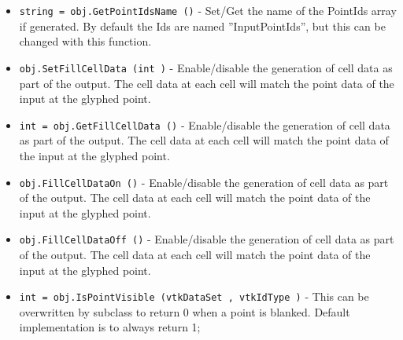 \begin{itemize}
\item  \verb|string = obj.GetPointIdsName ()| -  Set/Get the name of the PointIds array if generated. By default the Ids
 are named ''InputPointIds'', but this can be changed with this function.

\item  \verb|obj.SetFillCellData (int )| -  Enable/disable the generation of cell data as part of the output.
 The cell data at each cell will match the point data of the input
 at the glyphed point.

\item  \verb|int = obj.GetFillCellData ()| -  Enable/disable the generation of cell data as part of the output.
 The cell data at each cell will match the point data of the input
 at the glyphed point.

\item  \verb|obj.FillCellDataOn ()| -  Enable/disable the generation of cell data as part of the output.
 The cell data at each cell will match the point data of the input
 at the glyphed point.

\item  \verb|obj.FillCellDataOff ()| -  Enable/disable the generation of cell data as part of the output.
 The cell data at each cell will match the point data of the input
 at the glyphed point.

\item  \verb|int = obj.IsPointVisible (vtkDataSet , vtkIdType )| -  This can be overwritten by subclass to return 0 when a point is
 blanked. Default implementation is to always return 1;

\end{itemize}
